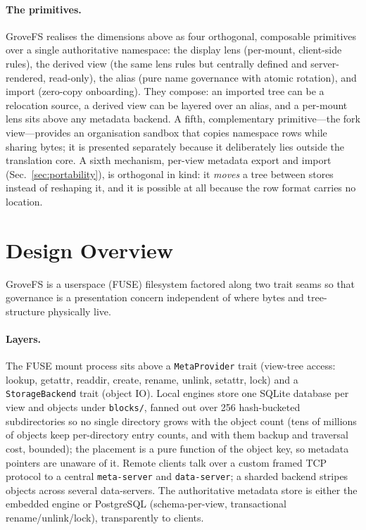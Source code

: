 \documentclass[numberedsection,acmtos]{acmart}
\begin{document}
\paragraph{The primitives.}
GroveFS realises the dimensions above as four orthogonal, composable primitives
over a single authoritative namespace: the display lens (per-mount, client-side
rules), the derived view (the same lens rules but centrally defined and
server-rendered, read-only), the alias (pure name governance with atomic
rotation), and import (zero-copy onboarding). They compose: an imported tree
can be a relocation source, a derived view can be layered over an alias, and a
per-mount lens sits above any metadata backend. A fifth, complementary
primitive---the fork view---provides an organisation sandbox that copies
namespace rows while sharing bytes; it is presented separately because it
deliberately lies outside the translation core. A sixth mechanism, per-view
metadata export and import (Sec.~\ref{sec:portability}), is orthogonal in kind:
it \emph{moves} a tree between stores instead of reshaping it, and it is
possible at all because the row format carries no location.

\section{Design Overview}
\label{sec:design}
GroveFS is a userspace (FUSE) filesystem factored along two trait seams so that
governance is a presentation concern independent of where bytes and
tree-structure physically live.

\paragraph{Layers.} The FUSE mount process sits above a
\texttt{MetaProvider} trait (view-tree access: lookup, getattr, readdir,
create, rename, unlink, setattr, lock) and a \texttt{StorageBackend} trait
(object IO). Local engines store one SQLite database per view and objects
under \texttt{blocks/}, fanned out over 256 hash-bucketed subdirectories so
no single directory grows with the object count (tens of millions of objects
keep per-directory entry counts, and with them backup and traversal cost,
bounded); the placement is a pure function of the object key, so metadata
pointers are unaware of it. Remote clients talk over a custom framed TCP protocol
to a central \texttt{meta-server} and \texttt{data-server}; a sharded backend
stripes objects across several data-servers. The authoritative metadata store
is either the embedded engine or PostgreSQL (schema-per-view, transactional
rename/unlink/lock), transparently to clients.
\end{document}
